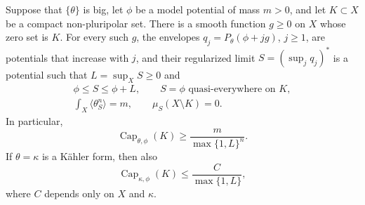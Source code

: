 \begin{lemma}\label{lem:penalized-compact-envelope}
Suppose that $\{\theta\}$ is big, let $\phi$ be a model potential of mass $m>0$, and let $K\subset X$ be a compact non-pluripolar set. There is a smooth function $g\geq0$ on $X$ whose zero set is $K$. For every such $g$, the envelopes $q_j=P_\theta(\phi+jg)$, $j\geq1$, are potentials that increase with $j$, and their regularized limit $S=(\sup_jq_j)^*$ is a potential such that $L=\sup_XS\geq0$ and
\[
 \begin{gathered}
 \phi\leq S\leq\phi+L,\qquad S=\phi\text{ quasi-everywhere on }K,\\
 \int_X\langle\theta_S^n\rangle=m,\qquad\mu_S(X\setminus K)=0.
 \end{gathered}
\]
In particular,
\begin{equation}\label{eq:penalized-capacity-lower-bound}
 \operatorname{Cap}_{\theta,\phi}(K)
                      \geq\frac{m}{\max\{1,L\}^{n}}.
\end{equation}
If $\theta=\kappa$ is a K\"ahler form, then also
\begin{equation}\label{eq:penalized-capacity-upper-bound}
 \operatorname{Cap}_{\kappa,\phi}(K)
                      \leq\frac{C}{\max\{1,L\}},
\end{equation}
where $C$ depends only on $X$ and $\kappa$.
\end{lemma}

